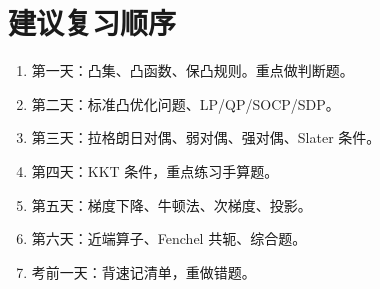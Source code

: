 \documentclass[11pt,a4paper]{ctexart}
\theoremstyle{definition}
\theoremstyle{plain}
\theoremstyle{remark}
\begin{document}
\section{建议复习顺序}

\begin{enumerate}
    \item 第一天：凸集、凸函数、保凸规则。重点做判断题。
    \item 第二天：标准凸优化问题、LP/QP/SOCP/SDP。
    \item 第三天：拉格朗日对偶、弱对偶、强对偶、Slater 条件。
    \item 第四天：KKT 条件，重点练习手算题。
    \item 第五天：梯度下降、牛顿法、次梯度、投影。
    \item 第六天：近端算子、Fenchel 共轭、综合题。
    \item 考前一天：背速记清单，重做错题。
\end{enumerate}
\end{document}
